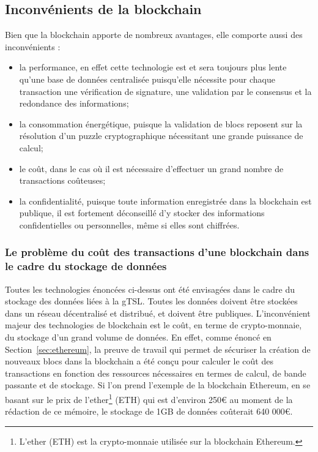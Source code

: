 \documentclass{tnreport}
\begin{document}
\subsection{Inconvénients de la blockchain}
\label{sec:drawbacks-blockchain}

Bien que la blockchain apporte de nombreux avantages, elle comporte aussi des inconvénients :
\begin{itemize}
	\item la performance, en effet cette technologie est et sera toujours plus lente qu'une base de données centralisée puisqu'elle nécessite pour chaque transaction une vérification de signature, une validation par le consensus et la redondance des informations; 
	\item la consommation énergétique, puisque la validation de blocs reposent sur la résolution d'un puzzle cryptographique nécessitant une grande puissance de calcul; 
	\item le coût, dans le cas où il est nécessaire d'effectuer un grand nombre de transactions coûteuses;
	\item la confidentialité, puisque toute information enregistrée dans la blockchain est publique, il est fortement déconseillé d'y stocker des informations confidentielles ou personnelles, même si elles sont chiffrées.
\end{itemize}

\subsubsection{Le problème du coût des transactions d'une blockchain dans le cadre du stockage de données}

Toutes les technologies énoncées ci-dessus ont été envisagées dans le cadre du stockage des données liées à la gTSL. Toutes les données doivent être stockées dans un réseau décentralisé et distribué, et doivent être publiques. L'inconvénient majeur des technologies de blockchain est le coût, en terme de crypto-monnaie, du stockage d'un grand volume de données. En effet, comme énoncé en Section~\ref{sec:ethereum}, la preuve de travail qui permet de sécuriser la création de nouveaux blocs dans la blockchain a été conçu pour calculer le coût des transactions en fonction des ressources nécessaires en termes de calcul, de bande passante et de stockage. Si l'on prend l'exemple de la blockchain Ethereum, en se basant sur le prix de l'ether\footnote{L'ether (ETH) est la crypto-monnaie utilisée sur la blockchain Ethereum.} (ETH) qui est d'environ 250€ au moment de la rédaction de ce mémoire, le stockage de 1GB de données coûterait 640 000€.
\end{document}
